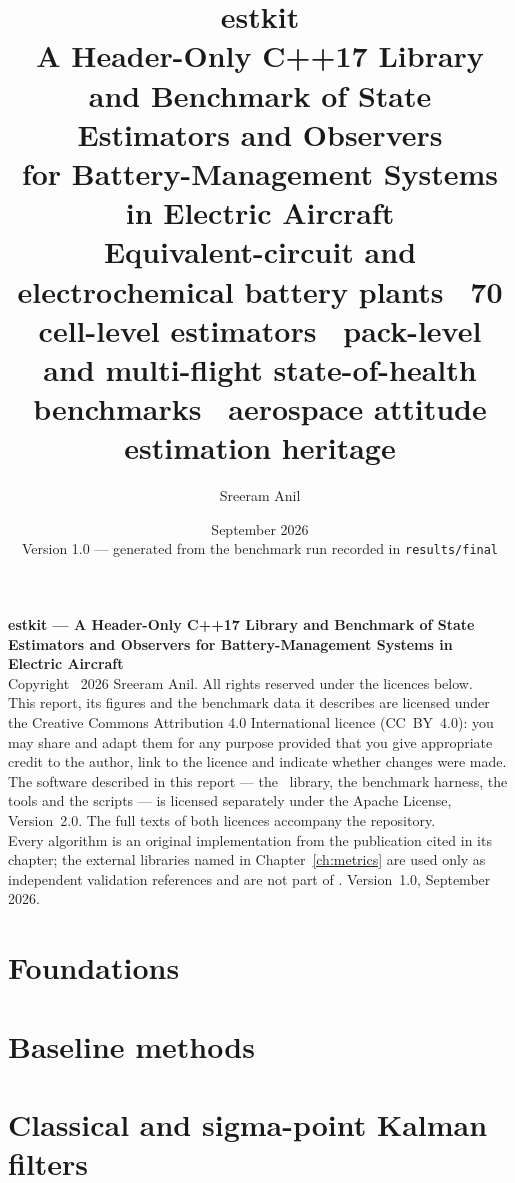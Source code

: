 \documentclass[11pt,a4paper,twoside,openany]{book}
\title{\textbf{estkit}\\[2mm]\Large A Header-Only C++17 Library and Benchmark of State Estimators and Observers\\[1mm]\large for Battery-Management Systems in Electric Aircraft\\[6mm]\normalsize Equivalent-circuit and electrochemical battery plants \textbullet\ 70 cell-level estimators \textbullet\ pack-level and multi-flight state-of-health benchmarks \textbullet\ aerospace attitude estimation heritage}
\author{Sreeram Anil}
\date{September 2026 \\[3mm] \small Version 1.0 — generated from the benchmark run recorded in \texttt{results/final}}
\begin{document}
\frontmatter
\maketitle
\thispagestyle{empty}
\vspace*{\fill}
\begin{flushleft}\small
\textbf{estkit --- A Header-Only C++17 Library and Benchmark of State Estimators and Observers for
Battery-Management Systems in Electric Aircraft}\\[2mm]
Copyright \textcopyright\ 2026 Sreeram Anil. All rights reserved under the licences below.\\[2mm]
This report, its figures and the benchmark data it describes are licensed under the Creative
Commons Attribution 4.0 International licence (CC~BY~4.0): you may share and adapt them for any
purpose provided that you give appropriate credit to the author, link to the licence and indicate
whether changes were made. The software described in this report --- the \estkit\ library, the
benchmark harness, the tools and the scripts --- is licensed separately under the Apache License,
Version~2.0. The full texts of both licences accompany the repository.\\[2mm]
Every algorithm is an original implementation from the publication cited in its chapter; the
external libraries named in Chapter~\ref{ch:metrics} are used only as independent validation
references and are not part of \estkit. Version~1.0, September 2026.
\end{flushleft}
\clearpage

\tableofcontents
\mainmatter

\part{Foundations}








\part{Baseline methods}


\part{Classical and sigma-point Kalman filters}

\end{document}
